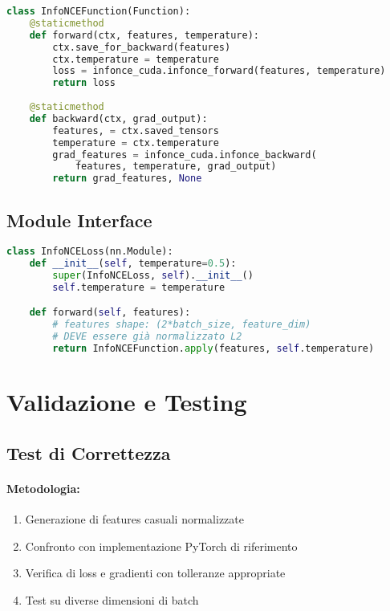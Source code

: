 \documentclass[a4paper,11pt]{article}
\begin{document}
\begin{lstlisting}[caption={Integrazione autograd},language=Python]
class InfoNCEFunction(Function):
    @staticmethod
    def forward(ctx, features, temperature):
        ctx.save_for_backward(features)
        ctx.temperature = temperature
        loss = infonce_cuda.infonce_forward(features, temperature)
        return loss
    
    @staticmethod
    def backward(ctx, grad_output):
        features, = ctx.saved_tensors
        temperature = ctx.temperature
        grad_features = infonce_cuda.infonce_backward(
            features, temperature, grad_output)
        return grad_features, None
\end{lstlisting}

\subsection{Module Interface}

\begin{lstlisting}[caption={Interface PyTorch},language=Python]
class InfoNCELoss(nn.Module):
    def __init__(self, temperature=0.5):
        super(InfoNCELoss, self).__init__()
        self.temperature = temperature

    def forward(self, features):
        # features shape: (2*batch_size, feature_dim)
        # DEVE essere già normalizzato L2
        return InfoNCEFunction.apply(features, self.temperature)
\end{lstlisting}

\section{Validazione e Testing}

\subsection{Test di Correttezza}

\paragraph{Metodologia:}
\begin{enumerate}
    \item Generazione di features casuali normalizzate
    \item Confronto con implementazione PyTorch di riferimento
    \item Verifica di loss e gradienti con tolleranze appropriate
    \item Test su diverse dimensioni di batch
\end{enumerate}
\end{document}
